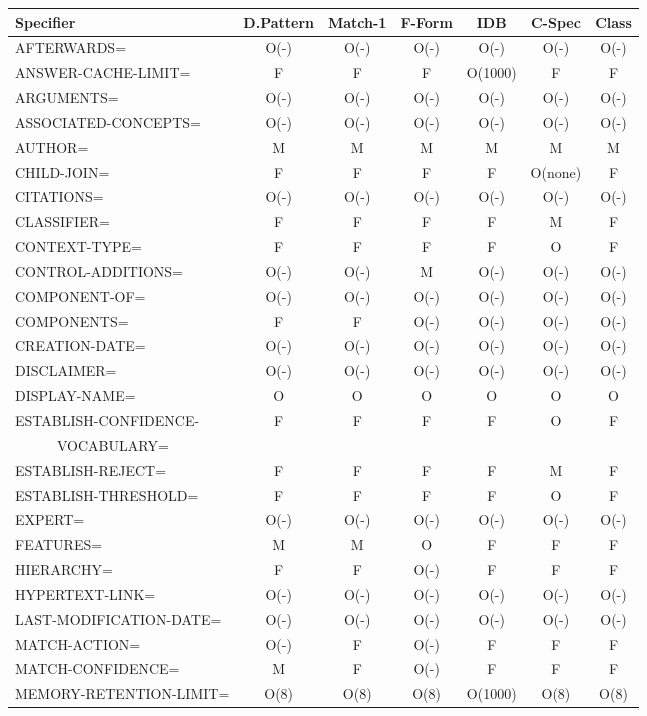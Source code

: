 \begin{tabular}{|l|c|c|c|c|c|c|} \hline
Specifier & D.Pattern & Match-1 & F-Form & IDB & C-Spec &
Class \\ \hline \hline
AFTERWARDS=  & O(-) & O(-) & O(-) & O(-) & O(-) & O(-) \\
ANSWER-CACHE-LIMIT= & F & F & F & O(1000) & F & F \\
ARGUMENTS= & O(-) & O(-) & O(-) & O(-) & O(-) & O(-) \\
ASSOCIATED-CONCEPTS= & O(-) & O(-) & O(-) & O(-) & O(-) & O(-) \\
AUTHOR= & M & M & M & M & M & M\\
CHILD-JOIN= & F & F & F & F & O(none) & F \\
CITATIONS= & O(-) & O(-) & O(-) & O(-) & O(-) & O(-) \\
CLASSIFIER= & F & F & F & F & M & F \\
CONTEXT-TYPE= & F & F & F & F & O\footnotemark & F \\
CONTROL-ADDITIONS= & O(-) & O(-) & M & O(-) & O(-) & O(-) \\
COMPONENT-OF= & O(-) & O(-) & O(-) & O(-) & O(-) & O(-) \\
COMPONENTS= & F & F & O(-) & O(-) & O(-) & O(-) \\
CREATION-DATE= & O(-) & O(-) & O(-) & O(-) & O(-) & O(-) \\
DISCLAIMER= & O(-) & O(-) & O(-) & O(-) & O(-) & O(-) \\
DISPLAY-NAME= & O & O & O & O & O & O\footnotemark \\
ESTABLISH-CONFIDENCE- & F & F & F & F & O & F \\
\ \ \ \ \ \ VOCABULARY= & & & & & & \\
ESTABLISH-REJECT= & F & F & F & F & M & F \\
ESTABLISH-THRESHOLD= & F & F & F & F & O & F \\
EXPERT= & O(-) & O(-) & O(-) & O(-) & O(-) & O(-) \\
FEATURES= & M & M & O & F & F & F \\
HIERARCHY= & F & F & O(-) & F & F & F \\
HYPERTEXT-LINK= & O(-) & O(-) & O(-) & O(-) & O(-) & O(-) \\
LAST-MODIFICATION-DATE= & O(-) & O(-) & O(-) & O(-) & O(-) & O(-) \\
MATCH-ACTION= & O(-) & F & O(-) & F & F & F \\
MATCH-CONFIDENCE= & M & F & O(-) & F & F & F \\
MEMORY-RETENTION-LIMIT= & O(8) & O(8) & O(8) & O(1000) & O(8) & O(8) \\

\end{tabular}
